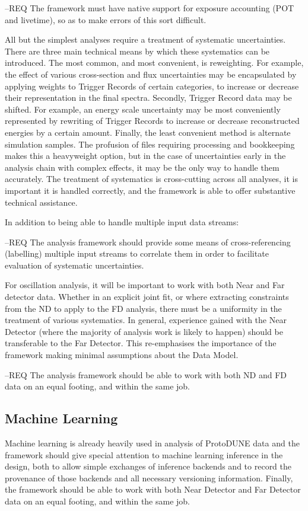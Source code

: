 \documentclass[../main-v1.tex]{subfiles}
\begin{document}
--REQ The framework must have native support for exposure accounting (POT and livetime), so as to make errors of this sort difficult.

All but the simplest analyses require a treatment of systematic uncertainties. There are three main technical means by which these systematics can be introduced. The most common, and most convenient, is reweighting. For example, the effect of various cross-section and flux uncertainties may be encapsulated by applying weights to Trigger Records of certain categories, to increase or decrease their representation in the final spectra. Secondly, Trigger Record data may be shifted. For example, an energy scale uncertainty may be most conveniently represented by rewriting of Trigger Records to increase or decrease reconstructed energies by a certain amount. Finally, the least convenient method is alternate simulation samples. The profusion of files requiring processing and bookkeeping makes this a heavyweight option, but in the case of uncertainties early in the analysis chain with complex effects, it may be the only way to handle them accurately. The treatment of systematics is cross-cutting across all analyses, it is important it is handled correctly, and the framework is able to offer substantive technical assistance.

In addition to being able to handle multiple input data streams:

--REQ The analysis framework should provide some means of cross-referencing (labelling) multiple input streams to correlate them in order to facilitate evaluation of systematic uncertainties.

For oscillation analysis, it will be important to work with both Near and Far detector data. Whether in an explicit joint fit, or where extracting constraints from the ND to apply to the FD analysis, there must be a uniformity in the treatment of various systematics. In general, experience gained with the Near Detector (where the majority of analysis work is likely to happen) should be transferable to the Far Detector.  This re-emphasises the importance of the framework making minimal assumptions about the Data Model.

--REQ The analysis framework should be able to work with both ND and FD data on an equal footing, and within the same job.


\subsection{Machine Learning} %
Machine learning is already heavily used in analysis of ProtoDUNE data and the framework should give special attention to machine learning inference in the design, both to allow simple exchanges of inference backends and to record the provenance of those backends and all necessary versioning information.  Finally, the framework should be able to work with both Near Detector and Far Detector data on an equal footing, and within the same job.
\end{document}
